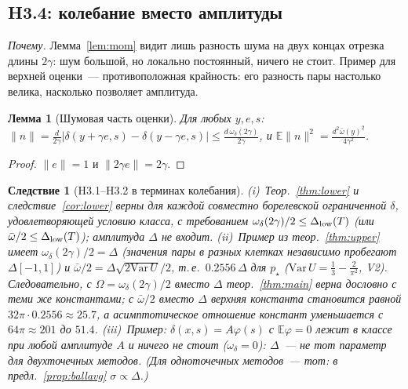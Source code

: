 \documentclass[11pt,a4paper]{article}
\numberwithin{equation}{section}
\newtheorem{lemma}[theorem]{Лемма}
\newtheorem{corollary}[theorem]{Следствие}
\theoremstyle{definition}
\theoremstyle{remark}
\newcommand{\E}{\mathbb E}\newcommand{\R}{\mathbb R}\newcommand{\Z}{\mathbb Z}\let\Prob\relax\newcommand{\Prob}{\mathbb P}
\newcommand{\norm}[1]{\lVert #1\rVert}\newcommand{\abs}[1]{\lvert #1\rvert}\newcommand{\ip}[2]{\langle #1,#2\rangle}
\newcommand{\wbar}{\bar\omega}\newcommand{\Atwo}{\cA^{\rm 2pt}_\gamma}
\begin{document}
\subsection{H3.4: колебание вместо амплитуды}\label{sec:osc}
\emph{Почему.} Лемма~\ref{lem:mom} видит лишь разность шума на двух концах отрезка длины $2\gamma$: шум большой, но локально постоянный, ничего не стоит. Пример для верхней оценки~--- противоположная крайность: его разность пары настолько велика, насколько позволяет амплитуда.

\begin{lemma}[Шумовая часть оценки]\label{lem:osc}
Для любых $y,e,s$: $\norm n=\frac d{2\gamma}\abs{\delta(y+\gamma e,s)-\delta(y-\gamma e,s)}\le\frac{d\,\omega_\delta(2\gamma)}{2\gamma}$, и $\E\norm n^2=\frac{d^2\wbar(y)^2}{4\gamma^2}$.
\end{lemma}
\begin{proof}
$\norm e=1$ и $\norm{2\gamma e}=2\gamma$.
\end{proof}

\begin{corollary}[H3.1--H3.2 в терминах колебания]\label{cor:osc}
(i)~Теор.~\ref{thm:lower} и следствие~\ref{cor:lower} верны для каждой совместно борелевской ограниченной $\delta$, удовлетворяющей условию класса, с требованием $\omega_\delta(2\gamma)/2\le\Delta_{\rm low}(T)$ (или $\wbar/2\le\Dlow(T)$); амплитуда $\Delta$ не входит. (ii)~Пример из теор.~\ref{thm:upper} имеет $\omega_\delta(2\gamma)/2=\Delta$ (значения пары в разных клетках независимо пробегают $\Delta[-1,1]$) и $\wbar/2=\Delta\sqrt{2\mathrm{Var}\,U}/2$, т.\,е.\ $0.2556\,\Delta$ для $p_\star$ ($\mathrm{Var}\,U=\frac13-\frac2{\pi^2}$, V2). Следовательно, с $\Omega=\omega_\delta(2\gamma)/2$ вместо $\Delta$ теор.~\ref{thm:main} верна дословно с теми же константами; с $\wbar/2$ вместо $\Delta$ верхняя константа становится равной $32\pi\cdot0.2556\approx25.7$, а асимптотическое отношение констант уменьшается с $64\pi\approx201$ до $51.4$. (iii)~Пример: $\delta(x,s)=A\varphi(s)$ с $\E\varphi=0$ лежит в классе при любой амплитуде $A$ и ничего не стоит ($\omega_\delta=0$): $\Delta$~--- не тот параметр для двухточечных методов. (Для одноточечных методов~--- тот: в предл.~\ref{prop:ballavg} $\sigma\propto\Delta$.)
\end{corollary}
\end{document}
